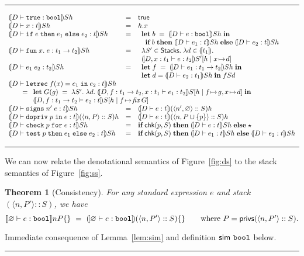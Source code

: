 \documentclass[submission,copyright,creativecommons]{eptcs}
\newcommand{\blackslug}{\rule{7pt}{7pt}}
\newcommand{\mletml}[3]{\MLET\;#1=#2\;\MIN\;#3}
\newcommand{\ifthenelse}[3]{\IF\;#1\;\THEN\;#2\;\ELSE\;#3}
\newcommand{\mifthenelse}[3]{\MIF\;#1\;\MTHEN\;#2\;\MELSE\;#3}
\newcommand{\enable}[2]{\ENABLE\;#1\;\IN\;#2}
\newcommand{\chk}[2]{\CHK\;#1\;\FOR\;#2}
\newcommand{\test}[3]{\TEST\;#1\;\THEN\;#2\;\ELSE\;#3}
\newcommand{\signs}[2]{\SIGNS\;#1\;#2}
\newcommand{\vmlet}[2]{\begin{array}[t]{l} \MLET\;{#1}\;\MIN\\
                            {#2}
                            \end{array}}
\newcommand{\BOOL}{\mbox{\texttt{bool}}}
\newcommand{\ELSE}{\mbox{\texttt{else}}}
\newcommand{\IF}{\mbox{\texttt{if}}}
\newcommand{\FOR}{\mbox{\texttt{for}}}
\newcommand{\IN}{\mbox{\texttt{in}}}
\newcommand{\MIN}{\mbox{\textbf{in}}}
\newcommand{\LET}{\mbox{\texttt{let}}}
\newcommand{\MLET}{\mbox{\textbf{let}}}
\newcommand{\REC}{{\texttt{rec}}}
\newcommand{\THEN}{{\texttt{then}}}
\newcommand{\MTHEN}{{\textbf{then}}}
\newcommand{\MELSE}{{\textbf{else}}}
\newcommand{\MIF}{{\textbf{if}}}
\newcommand{\TRUE}{{\texttt{true}}}
\newcommand{\ldb}{[\![}
\newcommand{\rdb}{]\!]}
\newcommand{\means}[1]{\ldb {#1}\rdb}
\newcommand{\union}{\cup}
\newcommand{\proves}{\vdash}
\newcommand{\ext}[3]{[#1\mid#2\!\mapsto\!#3]}
\newcommand{\recext}[5]{[#1\mid#2\!\mapsto\!#3,#4\!\mapsto\!#5]}
\newcommand{\lam}[2]{\lambda #1.\; #2} \newcommand{\all}[2]{\forall #1.\; #2}
\newcommand{\Empty}{\varnothing}
\newcommand{\tuple}[1]{\langle #1 \rangle}
\newcommand{\recdecl}[3]{\REC\;#1(#2) = #3}
\newcommand{\fix}{\textit{fix}}
\newcommand{\ENABLE}{\mbox{\texttt{dopriv}}}
\newcommand{\CHK}{\mbox{\texttt{check}}}
\newcommand{\TEST}{\mbox{\texttt{test}}}
\newcommand{\SIGNS}{\mbox{\texttt{signs}}}
\renewcommand{\check}{\textsf{chk}}
\newcommand{\privs}{\textsf{privs}}
\newcommand{\Sim}{\textsf{sim}}
\newcommand{\stacks}{\textsf{Stacks}}
\newcommand{\letdecl}[2]{\LET#1\;\IN\;#2}
\newcommand{\LAM}[2]{{\mathtt{fun}\; #1.\; #2}}
\newcommand{\D}{D} \newcommand{\ty}{t} \renewcommand{\th}{\theta}
\newcommand{\n}{n} \newcommand{\p}{p} \newcommand{\Ps}{\Pi} \newcommand{\h}{h}
\newcommand{\meanss}[1]{(\![ {#1}]\!)}
\newtheorem{theorem}{Theorem}[section]
\newenvironment{proof}{\begin{trivlist}\item[\hskip\labelsep{\bf
Proof:}]}{\blackslug\end{trivlist}}
\begin{document}
\begin{figure*}
\hrule
\medskip
\begin{small}
\[
\begin{array}{lcl}
\meanss{\D\proves\TRUE:\BOOL}S \h &=& \mathsf{true}
\\
\meanss{\D\proves x:\ty}S \h &=& h.x 
\\
\meanss{\D\proves\ifthenelse{e}{e_1}{e_2}:\ty}S \h &=&
  \vmlet{b\;=\;\meanss{\D\proves e:\BOOL}S \h}
       {\;\;\mifthenelse{b}
                    {\meanss{\D\proves e_1:\ty}S \h}
                    {\meanss{\D\proves e_2:\ty}S \h}}
\\
\meanss{\D\proves\LAM{x}{e}:\ty_1\to\ty_2}S \h &=&
\begin{array}[t]{l}
  \lam{S' \in \stacks }{
       \lam{d\in\meanss{\ty_1}}}{} \\
        \meanss{\D, x:\ty_1\proves e:\ty_2}S' \ext{\h}{x}{d}
\end{array}
\\
\meanss{\D\proves e_1\;e_2:\ty_2}S \h &=&
  \vmlet{f\;=\;\meanss{\D\proves e_1:\ty_1\to\ty_2}S \h}
        {\mletml{d}{\meanss{\D\proves e_2:\ty_1}S \h}{f S d}}
\\
\multicolumn{3}{l}{
\meanss{\D\proves\letdecl{\recdecl{f}{x}{e_1}}{e_2}:\ty}S \h} \\
\multicolumn{3}{l}{
\qquad 
= \vmlet{G(g)\;=\;
\lam{S'}
    {\lam{d}
         {\meanss{\D,f:\ty_1\to\ty_2,x:\ty_1\proves e_1:\ty_2}S
          \recext{\h}{f}{g}{x}{d}}}}
{\meanss{\D,f:\ty_1\to\ty_2\proves e_2:\ty}S \ext{\h}{f}{\fix\;G}}} 
\\
\meanss{\D\proves\signs{\n'}{e}:\ty}S \h &=&
\meanss{\D\proves e:\ty} (\tuple{\n',\Empty}::S) \h
\\
\meanss{\D\proves\enable{\p}{e}:\ty}(\tuple{\n,P}::S) \h 
&=&
\meanss{\D\proves e:\ty}(\tuple{\n,P\union\{\p\}}::S) \h
\\
\meanss{\D\proves\chk{\p}{e}:\ty}S \h &=&
\mifthenelse{\check(\p,S)}{\meanss{\D\proves e:\ty}S \h}{\star}
\\
\meanss{\D\proves\test{\p}{e_1}{e_2}:\ty}S \h &=&
\mifthenelse{\check(\p,S)}{\meanss{\D\proves e_1:\ty}S \h }
            {\meanss{\D\proves e_2:\ty}S \h }
\end{array}
\]
\end{small}

\medskip
\hrule
\medskip
\caption{Stack semantics}
\label{fig:ss}
\end{figure*}

We can now relate the denotational semantics of Figure~\ref{fig:ds} to the
stack semantics of Figure~\ref{fig:ss}.
\begin{theorem}[Consistency]\label{thm:cons}
For any standard expression $e$ and 
stack $(\tuple{\n, P'}::S)$, we have 
\[ \means{\Empty\proves e:\BOOL}\n P \{\}~=~
\meanss{\Empty\proves e:\BOOL}(\tuple{\n, P'}::S) \{\} 
\qquad\mbox{where $P=\privs(\tuple{\n, P'}::S)$}.
\]
\end{theorem}
\begin{proof}
Immediate consequence of Lemma~\ref{lem:sim} and definition  
$\Sim~\BOOL$ below.
\end{proof}
\end{document}
